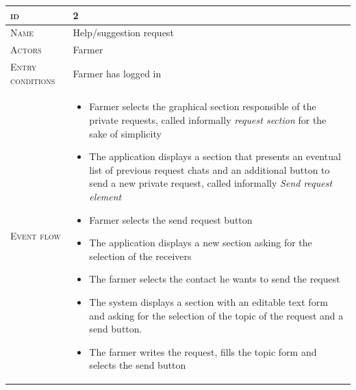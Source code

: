 
\begin{table}[H]
    \centering
    \begin{tabular}{|l|p{}|}
        \hline %
    	\textsc{id}                 &   2\\
    	\hline %
    	\textsc{Name}               &   Help/suggestion request\\
    	\hline %
    	\textsc{Actors}             &   Farmer\\
    	\hline %
    	\textsc{Entry conditions}   &   Farmer has logged in\\
    	\hline %
    	\textsc{Event flow}         &   %
            	                        \begin{itemize}
                                    	    \item Farmer selects the graphical section responsible of the private requests, called informally \textit{request section} for the sake of simplicity
                                    		\item The application displays a section that presents an eventual list of previous request chats and an additional button to send a new private request, called informally \textit{Send request element}
                                    		\item Farmer selects the send request button
                                    		\item The application displays a new section asking for the selection of the receivers
                                    		\item The farmer selects the contact he wants to send the request
                                    		\item The system displays a section with an editable text form and asking for the selection of the topic of the request and a send button.
                                    		\item The farmer writes the request, fills the topic form and selects the send button
                                        \end{itemize}\\

\end{tabular}
\end{table}
